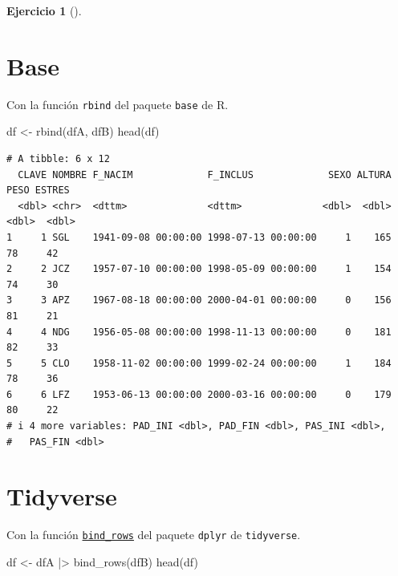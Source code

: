 \documentclass[
  a4paper,
]{scrreport}
\newenvironment{Shaded}{\begin{snugshade}}{\end{snugshade}}
\newcommand{\FunctionTok}[1]{\textcolor[rgb]{0.28,0.35,0.67}{#1}}
\newcommand{\NormalTok}[1]{\textcolor[rgb]{0.00,0.23,0.31}{#1}}
\newcommand{\OtherTok}[1]{\textcolor[rgb]{0.00,0.23,0.31}{#1}}
\newcommand{\SpecialCharTok}[1]{\textcolor[rgb]{0.37,0.37,0.37}{#1}}
\theoremstyle{definition}
\newtheorem{exercise}{Ejercicio}[chapter]
\theoremstyle{remark}
\begin{document}
\begin{exercise}[]
\begin{enumerate}
\begin{tcolorbox}
  \section{Base}

  Con la función \texttt{rbind} del paquete \texttt{base} de R.

\begin{Shaded}
\begin{Highlighting}[]
\NormalTok{df }\OtherTok{\textless{}{-}} \FunctionTok{rbind}\NormalTok{(dfA, dfB)}
\FunctionTok{head}\NormalTok{(df)}
\end{Highlighting}
\end{Shaded}

\begin{verbatim}
# A tibble: 6 x 12
  CLAVE NOMBRE F_NACIM             F_INCLUS             SEXO ALTURA  PESO ESTRES
  <dbl> <chr>  <dttm>              <dttm>              <dbl>  <dbl> <dbl>  <dbl>
1     1 SGL    1941-09-08 00:00:00 1998-07-13 00:00:00     1    165    78     42
2     2 JCZ    1957-07-10 00:00:00 1998-05-09 00:00:00     1    154    74     30
3     3 APZ    1967-08-18 00:00:00 2000-04-01 00:00:00     0    156    81     21
4     4 NDG    1956-05-08 00:00:00 1998-11-13 00:00:00     0    181    82     33
5     5 CLO    1958-11-02 00:00:00 1999-02-24 00:00:00     1    184    78     36
6     6 LFZ    1953-06-13 00:00:00 2000-03-16 00:00:00     0    179    80     22
# i 4 more variables: PAD_INI <dbl>, PAD_FIN <dbl>, PAS_INI <dbl>,
#   PAS_FIN <dbl>
\end{verbatim}

  \section{Tidyverse}

  Con la función
  \href{https://dplyr.tidyverse.org/reference/bind.html}{\texttt{bind\_rows}}
  del paquete \texttt{dplyr} de \texttt{tidyverse}.

\begin{Shaded}
\begin{Highlighting}[]
\NormalTok{df }\OtherTok{\textless{}{-}}\NormalTok{ dfA }\SpecialCharTok{|\textgreater{}} \FunctionTok{bind\_rows}\NormalTok{(dfB)}
\FunctionTok{head}\NormalTok{(df)}
\end{Highlighting}
\end{Shaded}


\end{tcolorbox}
\end{enumerate}
\end{exercise}
\end{document}
